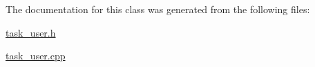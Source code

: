 The documentation for this class was generated from the following files\+:\begin{DoxyCompactItemize}
\item 
\hyperlink{task__user_8h}{task\+\_\+user.\+h}\item 
\hyperlink{task__user_8cpp}{task\+\_\+user.\+cpp}\end{DoxyCompactItemize}
